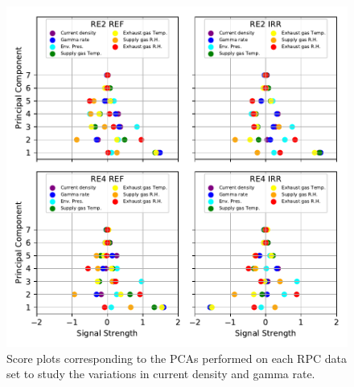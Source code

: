 \endgroup
	
	\begin{figure}[H]
    	\centering
		\includegraphics[width = \linewidth]{fig/chapt5/Full-Data-variation-Scores.pdf}
        \caption{\label{fig:GIFpp-Score_FullData} Score plots corresponding to the PCAs performed on each RPC data set to study the variations in current density and gamma rate.}
	\end{figure}

